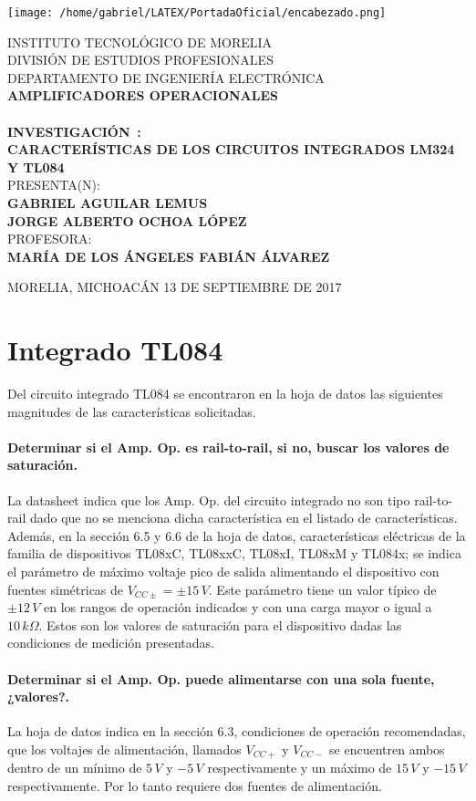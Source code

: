 \documentclass{article}
\newcommand{\materia}{\uppercase{Amplificadores Operacionales}}
\newcommand{\maestro}{\uppercase{María De Los Ángeles Fabián Álvarez}}
\newcommand{\tipoDoc}{\uppercase{}} %
\newcommand{\nombreDoc}{\uppercase{Investigación}}
\newcommand{\docNum}{}
\newcommand{\subNombreDoc}{\uppercase{Características de los circuitos integrados LM324 y TL084}}
\newcommand{\alumnos}{\uppercase{GABRIEL AGUILAR LEMUS \\ Jorge Alberto Ochoa López}}
\newcommand{\fecha}{\uppercase{13 de Septiembre de 2017}}
\newcommand{\unidad}[1]{\,\si{#1}}
\begin{document}
	
	\texttt{[image: /home/gabriel/LATEX/PortadaOficial/encabezado.png]}
	\begin{center}
{
	\huge INSTITUTO TECNOLÓGICO DE MORELIA \\
	\vfill
	\large DIVISIÓN DE ESTUDIOS PROFESIONALES  \\
	\vfill
	\large  DEPARTAMENTO DE INGENIERÍA ELECTRÓNICA \\ 
	\vfill
	\Large \textbf \materia \\
	\vfill
	\textbf{\tipoDoc} \\
	\vfill 
	\LARGE  \textbf{ \nombreDoc  \, \docNum: \\ \subNombreDoc} \\
	\vfill
	\large PRESENTA(N): \\
	\LARGE  \textbf{\alumnos} \\
	\vfill
	\large PROFESORA: \\
	\Large \textbf{\maestro }
}
	\end{center}
	\vfill 
	\begin{flushleft}
		MORELIA, MICHOACÁN \hfill \uppercase{\fecha}
	\end{flushleft}
	\pagebreak
	\section{Integrado TL084}
	Del circuito integrado TL084 se encontraron en la hoja de datos las siguientes magnitudes de las características solicitadas.
	\paragraph{Determinar si el Amp. Op. es rail-to-rail, si no, buscar los valores de saturación.}
	La datasheet indica que los Amp. Op. del circuito integrado no son tipo rail-to-rail dado que no se menciona dicha característica en el listado de características. Además, en la sección 6.5 y 6.6 de la hoja de datos, características eléctricas de la familia de dispositivos TL08xC, TL08xxC, TL08xI, TL08xM y TL084x; se indica el parámetro de máximo voltaje pico de salida alimentando el dispositivo con fuentes simétricas de $V_{CC \pm} = \pm 15 \unidad{V} $. Este parámetro tiene un valor típico de $\pm 12 \unidad{V}$ en los rangos de operación indicados y con una carga mayor o igual a $10 \unidad{k \Omega}$. Estos son los valores de saturación para el dispositivo dadas las condiciones de medición presentadas.
	\paragraph{Determinar si el Amp. Op. puede alimentarse con una sola fuente, ¿valores?.}
	La hoja de datos indica en la sección 6.3, condiciones de operación recomendadas, que los voltajes de alimentación, llamados $V_{CC+}$ y $V_{CC-}$ se encuentren ambos dentro de un mínimo de $5\unidad{V}$ y $-5\unidad{V}$ respectivamente y un máximo de $15\unidad{V}$ y $-15\unidad{V}$ respectivamente. Por lo tanto requiere dos fuentes de alimentación.
\end{document}
